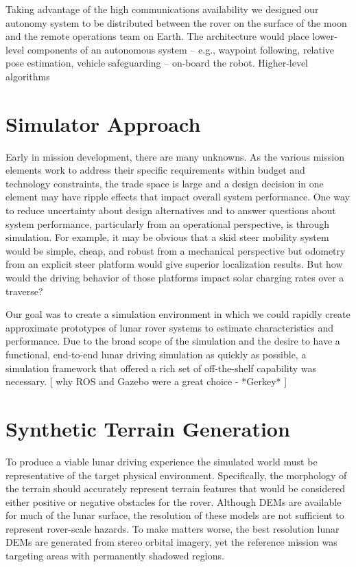 \documentclass[twocolumn,letterpaper]{IEEEAerospaceCLS}  %
\begin{document}
Taking advantage of the high communications availability we designed our autonomy system to be distributed between the rover on the surface of the moon and the remote operations team on Earth.  The architecture would place lower-level components of an autonomous system -- e.g., waypoint following, relative pose estimation, vehicle safeguarding  -- on-board the robot.  Higher-level algorithms 


\section{Simulator Approach}

Early in mission development, there are many unknowns. As the various mission elements work to address their specific requirements within budget and technology constraints, the trade space is large and a design decision in one element may have ripple effects that impact overall system performance. One way to reduce uncertainty about design alternatives and to answer questions about system performance, particularly from an operational perspective, is through simulation. For example, it may be obvious that a skid steer mobility system would be simple, cheap, and robust from a mechanical perspective but odometry from an explicit steer platform would give superior localization results. But how would the driving behavior of those platforms impact solar charging rates over a traverse? 

Our goal was to create a simulation environment in which we could rapidly create approximate prototypes of lunar rover systems to estimate characteristics and performance. Due to the broad scope of the simulation and the desire to have a functional, end-to-end lunar driving simulation as quickly as possible, a simulation framework that offered a rich set of off-the-shelf capability was necessary. [ why ROS and Gazebo were a great choice - *Gerkey* ] 


\section{Synthetic Terrain Generation}

To produce a viable lunar driving experience the simulated world must be representative of the target physical environment. Specifically, the morphology of the terrain should accurately represent terrain features that would be considered either positive or negative obstacles for the rover. Although DEMs are available for much of the lunar surface, the resolution of these models are not sufficient to represent rover-scale hazards. To make matters worse, the best resolution lunar DEMs are generated from stereo orbital imagery, yet the reference mission was targeting areas with permanently shadowed regions. 
\end{document}
